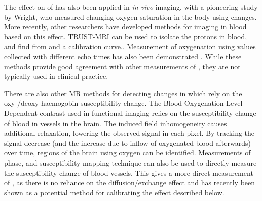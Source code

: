 The effect on \Ttwo of \SOtwo has also been applied in \textit{in-vivo} imaging, with a pioneering study by Wright\cite{WrightEstimatingoxygensaturation1991}, who measured changing oxygen saturation in the body using \Ttwo changes.
More recently, other researchers have developed methods for imaging \SOtwo in blood based on this \Ttwo effect\cite{RodgersMRIbasedmethodsquantification2016}.
TRUST-MRI can be used to isolate the protons in blood, and find \SOtwo from \Ttwo and a calibration curve.\cite{LuQuantitativeevaluationoxygenation2008}.
Measurement of oxygenation using \Ttwo values collected with different echo times has also been demonstrated \cite{VargheseCMRbasedbloodoximetry2017}.
While these methods provide good agreement with other measurements of \SOtwo, they are not typically used in clinical practice.

There are also other MR methods for detecting changes in \SOtwo which rely on the oxy-/deoxy-haemogobin susceptibility change.
The Blood Oxygenation Level Dependent contrast used in functional imaging relies on the susceptibility change of blood in vessels in the brain.
The induced field inhomogeneity causes additional \Ttwostar relaxation, lowering the observed signal in each pixel.
By tracking the signal decrease (and the increase due to inflow of oxygenated blood afterwards) over time, regions of the brain using oxygen can be identified.
Measurements of phase, and susceptibility mapping technique can also be used to directly measure the susceptibility change of blood vessels\cite{Haackevivomeasurementblood1997,Fernandez-SearaMRsusceptometrymeasuring2006a,JainInvestigatingmagneticsusceptibility2012}.
This gives a more direct measurement of \SOtwo, as there is no reliance on the diffusion/exchange effect and has recently been shown as a potential method for calibrating the \Ttwo effect described below.\cite{LanghamvivowholebloodT22018}
